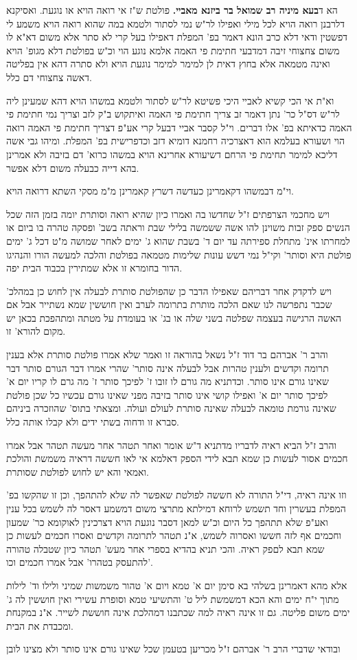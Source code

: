 \documentclass[12pt, openany]{book}
\begin{document}
{הא ד\textbf{בעא מיניה רב שמואל בר ביזנא מאביי.}  פולטת ש"ז אי רואה הויא או נוגעת. ואסיקנא דלרבנן רואה הויא לכל מילי ואפילו לר"ש נמי לסתור ולטמא במה שהוא רואה הויא משמע לי דפשטין ודאי דלא כרב הונא דאמר בפ' המפלת דאפילו בעל קרי לא סתר אלא משום דא"א לו משום צחצוחי זיבה דמדבעי חתימת פי האמה אלמא נוגע הוי וכ"ש בפולטת דלא מגופ' הויא ואינה מטמאה אלא בחוץ דאית לן למימר למימר נוגעת הויא ולא סתרה דהא אין בפליטה דאשה צחצוחי דם כלל.\par  וא"ת אי הכי קשיא לאביי היכי פשיטא לר"ש לסתור ולטמא במשהו הויא דהא שמעינן ליה לר"ש דס"ל כר' נתן דאמר זב צריך חתימת פי האמה ואיתקוש ב"ק לזב וצריך נמי חתימת פי האמה כדאיתא בפ' אלו דברים. וי"ל קסבר אביי דבעל קרי אע"פ דצריך חתימת פי האמה רואה הוי ושעורא בעלמא הוא דאצרכיה רחמנא דומיא דזב וכדפרישית בפ' המפלת. ומיהו גבי אשה דליכא למימר תחימת פי הרחם דשיעורא אחרינא הויא במשהו כרוא' דם בזיבה ולא אמרינן בהא דייה כבעלה משום דלא אפשר.\par  וי"מ דבמשהו דקאמרינן כעדשה דשרץ קאמרינן מ"מ מסקי השתא דרואה הויא.\par ויש מחכמי הצרפתים ז"ל שחדשו בה ואמרו כיון שהיא רואה וסותרת יומה בזמן הזה שכל הנשים ספק זבות משוינן להו אשה ששמשה בלילי שבת וראתה בשב' ופסקה טהרה בו ביום או למחרתו אינ' מתחלת ספירתה עד יום ד' בשבת שהוא ג' ימים לאחר שמושה מ"ט דכל ג' ימים פולטת היא וסותר' וקי"ל נמי דשש עונות שלימות מטמאה בפולטת והלכה למעשה הורו והנהיגו הדור בחומרא זו אלא שמתירין בכבוד הבית יפה.\par ויש לדקדק אחר דבריהם שאפילו הדבר כן שהפולטת סותרת לבעלה אין לחוש כן במהלכ' שכבר נתפרשה לנו שאם הלכה מותרת בתרומה לערב ואין חוששין שמא נשתייר אבל אם האשה הרגישה בעצמה שפלטה בשני שלה או בג' או בעומדת על מטתה ומתהפכת בכאן יש מקום להורא' זו.\par  והרב ר' אברהם בר דוד ז"ל נשאל בהוראה זו ואמר שלא אמרו פולטת סותרת אלא בענין תרומה וקדשים ולענין טהרות אבל לבעלה אינה סותר' שהרי אמרו דבר הגורם סותר דבר שאינו גורם אינו סותר. וכדתניא מה גורם לו זובו ז' לפיכך סותר ז' מה גרם לו קריו יום א' לפיכך סותר יום א' ואפילו קושי אינו סותר בזיבה מפני שאינו גורם עכשיו כל שכן פולטת שאינה גורמת טומאה לבעלה שאינה סותרת לעולם ועולה. ומצאתי בתוס' שהוזכרה ביניהם סברא זו ודחוה בשתי ידים ולא קבלו אותה כלל.\par  והרב ז"ל הביא ראיה לדבריו מדתניא ד"ש אומר ואחר תטהר אחר מעשה תטהר אבל אמרו חכמים אסור לעשות כן שמא תבא לידי הספק דאלמא אי לאו חששה דראיה משמשת והולכת ואמאי והא יש לחוש לפולטת שסותרת.\par  וזו אינה ראיה, די"ל התורה לא חששה לפולטת שאפשר לה שלא להתהפך, וכן זו שהקשו בפ' המפלת בעשרין וחד תשמש לרוחא דמילתא מתרצי משום דמשמע דאסר לה לשמש בכל ענין ואע"פ שלא תתהפך כל היום וכ"ש למאן דסבר נוגעת הויא דצרכינין לאוקומא כר' שמעון וחכמים אף לזה חששו ואסרוה לשמש, א"נ תטהר לתרומה וקדשים ואסרו חכמים לעשות כן שמא תבא לםפק ראיה. והכי תניא בהדיא בספרי אחר מעש' תטהר כיון שטבלה טהורה להתעסק בטהרו' אבל אמרו חכמים וכו'.\par אלא מהא דאמרינן בשלהי בא סימן יום א' טמא ויום א' טהור משמשות שמיני ולילו וד' לילות מתוך י"ח ימים והא הכא דמשמשת ליל ט' והתשיעי טמא וסופרת עשירי ואין חוששין לה ג' ימים משום פליטה. גם זו אינה ראיה למה שכתבנו דמהלכת אינה חוששת לשייר. א"נ במקנחת ומכבדת את הבית.\par  ובודאי שדברי הרב ר' אברהם ז"ל מכריען בטעמן שכל שאינו גורם אינו סותר ולא מצינו לובן }
\end{document}
